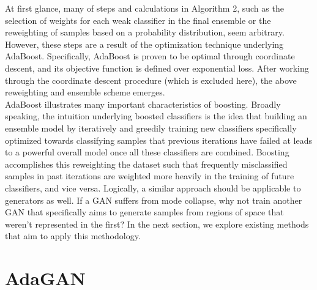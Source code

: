 \documentclass[submission]{eptcs}
\begin{document}
At first glance, many of steps and calculations in Algorithm 2, such as the selection of weights for each weak classifier in the final ensemble or the reweighting of samples based on a probability distribution, seem arbitrary. However, these steps are a result of the optimization technique underlying AdaBoost. Specifically, AdaBoost is proven to be optimal through coordinate descent, and its objective function is defined over exponential loss. After working through the coordinate descent procedure (which is excluded here), the above reweighting and ensemble scheme emerges. \\

AdaBoost illustrates many important characteristics of boosting. Broadly speaking, the intuition underlying boosted classifiers is the idea that building an ensemble model by iteratively and greedily training new classifiers specifically optimized towards classifying samples that previous iterations have failed at leads to a powerful overall model once all these classifiers are combined. Boosting accomplishes this reweighting the dataset such that frequently misclassified samples in past iterations are weighted more heavily in the training of future classifiers, and vice versa. Logically, a similar approach should be applicable to generators as well. If a GAN suffers from mode collapse, why not train another GAN that specifically aims to generate samples from regions of space that weren't represented in the first? In the next section, we explore existing methods that aim to apply this methodology.

\section{AdaGAN}
\end{document}
